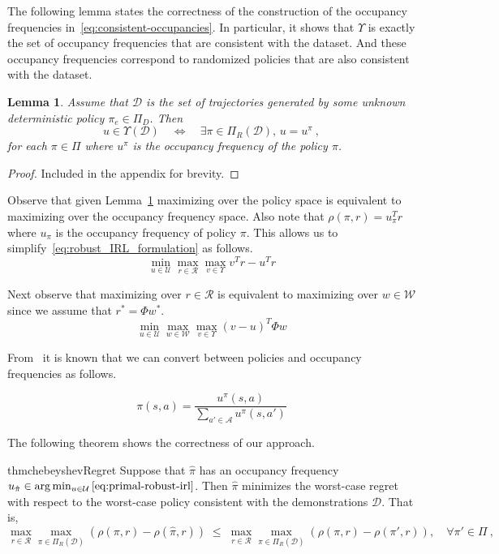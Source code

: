 \documentclass[11pt]{uai2023}
\newtheorem{lemma}{Lemma}
\begin{document}
The following lemma states the correctness of the construction of the occupancy frequencies in~\eqref{eq:consistent-occupancies}. In particular, it shows that $\Upsilon$ is exactly the set of occupancy frequencies that are consistent with the dataset. And these occupancy frequencies correspond to randomized policies that are also consistent with the dataset.

\begin{lemma}\label{lemma:occ_freq_matching}
	Assume that $\mathcal{D}$ is the set of trajectories generated by some unknown deterministic policy $\pi_e \in \Pi_D$. Then
	\[
		u \in \Upsilon(\mathcal{D})  \quad \Leftrightarrow \quad  \exists \pi \in \Pi_R(\mathcal{D}), \, u = u^{\pi}~,
	\]
	for each $\pi \in \Pi$ where $u^{\pi}$ is the occupancy frequency of the policy $\pi$.
\end{lemma}
\begin{proof}
	Included in the appendix for brevity.
\end{proof}

Observe that given Lemma~\ref{lemma:occ_freq_matching} maximizing over the policy space is equivalent to maximizing over the occupancy frequency space.
Also note that $\rho(\pi,r) = u_{\pi}^T r$ where $u_{\pi}$ is the occupancy frequency of policy $\pi$. This allows us to simplify~\eqref{eq:robust_IRL_formulation} as follows.
%
\begin{equation}
	\min_{u \in \mathcal{U}} \max_{r \in \mathcal{R}} \max_{v \in \Upsilon} v^T r - u^T r
\end{equation}

Next observe that maximizing over $r \in \mathcal{R}$ is equivalent to maximizing over $w \in \mathcal{W}$ since we assume that $r^* = \Phi w^*$.
%
\begin{equation}\label{eq:primal-robust-irl}
	\min_{u \in \mathcal{U}} \max_{w \in \mathcal{W}} \max_{v \in \Upsilon} (v - u)^T \Phi w
\end{equation}

From~\cite{Puterman1994} it is known that we can convert between policies and occupancy frequencies as follows.

\begin{equation}\label{eq:policy-construction}
	\pi(s, a) = \frac{u^{\pi}(s,a)}{\sum_{a' \in \mathcal{A}} u^{\pi}(s,a')}
\end{equation}

The following theorem shows the correctness of our approach.

\begin{restatable}{thm}{chebeyshevRegret}
\label{thrm:chebeyshevRegret}
	Suppose that $\hat{\pi}$ has an occupancy frequency $u_{\hat{\pi}} \in \arg\min_{u \in \mathcal{U}} \ref{eq:primal-robust-irl}$.
	Then $\hat{\pi}$ minimizes the worst-case regret with respect to the worst-case policy consistent with the demonstrations $\mathcal{D}$. That is,
	\[
		\max_{r\in \mathcal{R}} \max_{\pi \in \Pi_{R}(\mathcal{D})} \left(\rho(\pi, r) - \rho(\hat{\pi}, r)\right)
		\; \le\;
		\max_{r\in \mathcal{R}} \max_{\pi \in \Pi_{R}(\mathcal{D})} \left(\rho(\pi, r) - \rho(\pi', r)\right), \quad  \forall \pi' \in \Pi~,
	\]
\end{restatable}
\end{document}
